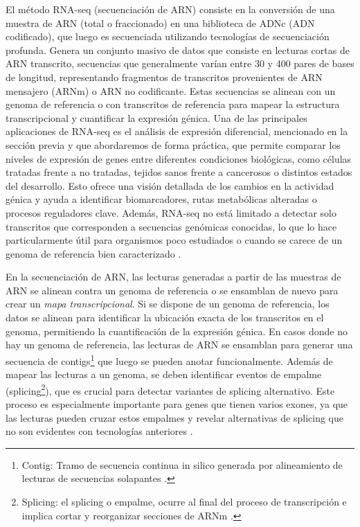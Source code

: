 El método RNA-seq (secuenciación de ARN) consiste en la conversión de una muestra de ARN (total o fraccionado) en una biblioteca de ADNc 
(ADN codificado), que luego es secuenciada utilizando tecnologías de secuenciación profunda. Genera un conjunto masivo de datos que consiste 
en lecturas cortas de ARN transcrito, secuencias que generalmente varían entre 30 y 400 pares de bases de longitud, representando fragmentos 
de transcritos provenientes de ARN mensajero (ARNm) o ARN no codificante. Estas secuencias se alinean con un genoma de referencia o con 
transcritos de referencia para mapear la estructura transcripcional y cuantificar la expresión génica. Una de las principales aplicaciones 
de RNA-seq es el análisis de expresión diferencial, mencionado en la sección previa y que abordaremos de forma práctica, que permite comparar 
los niveles de expresión de genes entre diferentes condiciones 
biológicas, como células tratadas frente a no tratadas, tejidos sanos frente a cancerosos o distintos estados del desarrollo. Esto ofrece 
una visión detallada de los cambios en la actividad génica y ayuda a identificar biomarcadores, rutas metabólicas alteradas o procesos 
reguladores clave. Además, RNA-seq no está limitado a detectar solo transcritos que corresponden a secuencias genómicas conocidas, 
lo que lo hace particularmente útil para organismos poco estudiados o cuando se carece de un genoma de referencia bien caracterizado \cite{transcriptomics-2-RNA-seq}.\newline

En la secuenciación de ARN, las lecturas generadas a partir de las muestras de ARN se alinean contra un genoma de referencia o se ensamblan de
nuevo para crear un \textit{mapa transcripcional}. Si se dispone de un genoma de referencia, los datos se alinean para identificar la ubicación exacta de
los transcritos en el genoma, permitiendo la cuantificación de la expresión génica. En casos donde no hay un genoma de referencia, las lecturas 
de ARN se ensamblan para generar una secuencia de contigs\footnote[3]{Contig: Tramo de secuencia continua in silico generada por alineamiento 
de lecturas de secuencias solapantes \cite{contig-definition}.} que luego se pueden anotar funcionalmente. Además de mapear las lecturas a un genoma, 
se deben identificar eventos de empalme (splicing\footnote[4]{Splicing: el splicing o empalme, ocurre al final del proceso de transcripción e 
implica cortar y reorganizar secciones de ARNm \cite{splicing-definition}.}), que es crucial para detectar variantes de splicing alternativo. Este proceso es especialmente 
importante para genes que tienen varios exones, ya que las lecturas pueden cruzar estos empalmes y revelar alternativas de splicing que no son 
evidentes con tecnologías anteriores \cite{transcriptomics-2-RNA-seq-2}. \newline %

